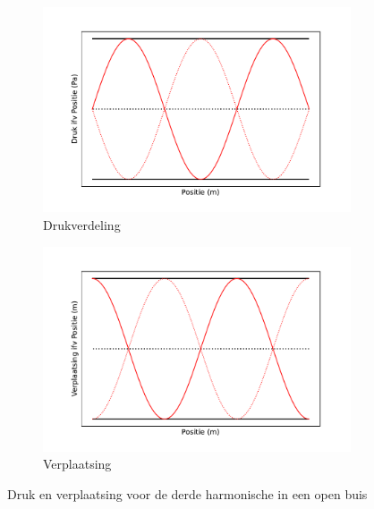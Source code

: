 \documentclass[a4paper,kul]{kulakarticle} %
\begin{document}
\begin{figure}[!h]
	\centering
	\begin{subfigure}{.5\textwidth}
		\centering
		\includegraphics[width=1\linewidth]{OpenBuisDerdeDruk}
		\caption{Drukverdeling}
		\label{fig:DerdeBuisDruk}
	\end{subfigure}%
	\begin{subfigure}{.5\textwidth}
		\centering
		\includegraphics[width=1\linewidth]{OpenBuisDerdeVerplaatsing}
		\caption{Verplaatsing}
		\label{fig:DerdeBuisVerplaatsing}
	\end{subfigure}
	\caption{Druk en verplaatsing voor de derde harmonische in een open buis}
	\label{fig:OpenBuisDerde}
\end{figure}
\end{document}
